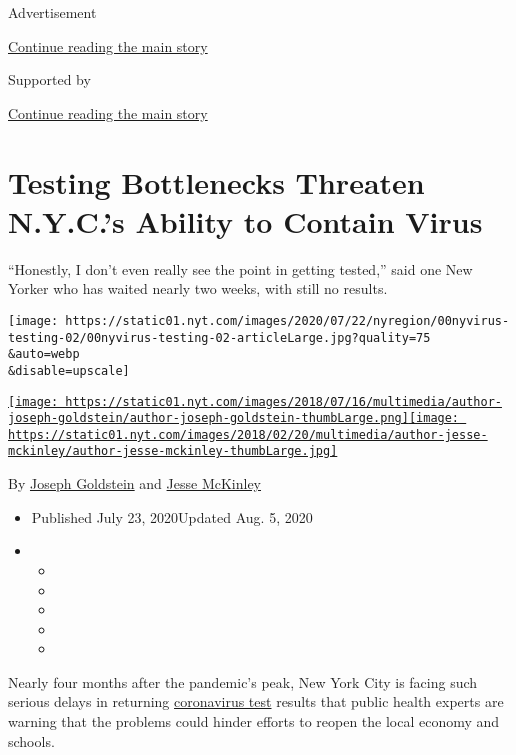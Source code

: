 Advertisement

\protect\hyperlink{after-top}{Continue reading the main story}

Supported by

\protect\hyperlink{after-sponsor}{Continue reading the main story}

\hypertarget{testing-bottlenecks-threaten-nycs-ability-to-contain-virus}{%
\section{Testing Bottlenecks Threaten N.Y.C.'s Ability to Contain
Virus}\label{testing-bottlenecks-threaten-nycs-ability-to-contain-virus}}

``Honestly, I don't even really see the point in getting tested,'' said
one New Yorker who has waited nearly two weeks, with still no results.

\texttt{[image: https://static01.nyt.com/images/2020/07/22/nyregion/00nyvirus-testing-02/00nyvirus-testing-02-articleLarge.jpg?quality=75\\\&auto=webp\\\&disable=upscale]}

\href{https://www.nytimes.com/by/joseph-goldstein}{\texttt{[image: https://static01.nyt.com/images/2018/07/16/multimedia/author-joseph-goldstein/author-joseph-goldstein-thumbLarge.png]}}\href{https://www.nytimes.com/by/jesse-mckinley}{\texttt{[image: https://static01.nyt.com/images/2018/02/20/multimedia/author-jesse-mckinley/author-jesse-mckinley-thumbLarge.jpg]}}

By \href{https://www.nytimes.com/by/joseph-goldstein}{Joseph Goldstein}
and \href{https://www.nytimes.com/by/jesse-mckinley}{Jesse McKinley}

\begin{itemize}
\item
  Published July 23, 2020Updated Aug. 5, 2020
\item
  \begin{itemize}
  \item
  \item
  \item
  \item
  \item
  \end{itemize}
\end{itemize}

Nearly four months after the pandemic's peak, New York City is facing
such serious delays in returning
\href{https://www.nytimes.com/2020/08/05/world/europe/germany-coronavirus-test-travelers.html}{coronavirus
test} results that public health experts are warning that the problems
could hinder efforts to reopen the local economy and schools.

